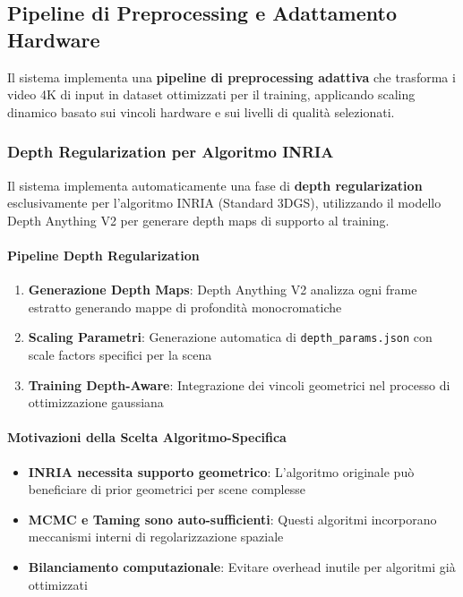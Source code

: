 \subsection{Pipeline di Preprocessing e Adattamento Hardware}
\label{subsec:pipeline_preprocessing}

Il sistema implementa una \textbf{pipeline di preprocessing adattiva} che trasforma i video 4K di input in dataset ottimizzati per il training, applicando scaling dinamico basato sui vincoli hardware e sui livelli di qualità selezionati.

\subsubsection{Depth Regularization per Algoritmo INRIA}

\label{subsubsec:depth_regularization}

Il sistema implementa automaticamente una fase di \textbf{depth regularization} esclusivamente per l'algoritmo INRIA (Standard 3DGS), utilizzando il modello Depth Anything V2 per generare depth maps di supporto al training.

\paragraph{Pipeline Depth Regularization}
\begin{enumerate}
	\item \textbf{Generazione Depth Maps}: Depth Anything V2 analizza ogni frame estratto generando mappe di profondità monocromatiche
	\item \textbf{Scaling Parametri}: Generazione automatica di \texttt{depth\_params.json} con scale factors specifici per la scena
	\item \textbf{Training Depth-Aware}: Integrazione dei vincoli geometrici nel processo di ottimizzazione gaussiana
\end{enumerate}

\paragraph{Motivazioni della Scelta Algoritmo-Specifica}
\begin{itemize}
	\item \textbf{INRIA necessita supporto geometrico}: L'algoritmo originale può beneficiare di prior geometrici per scene complesse
	\item \textbf{MCMC e Taming sono auto-sufficienti}: Questi algoritmi incorporano meccanismi interni di regolarizzazione spaziale
	\item \textbf{Bilanciamento computazionale}: Evitare overhead inutile per algoritmi già ottimizzati
\end{itemize}

